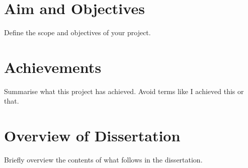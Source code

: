 \section{Aim and Objectives} \label{sec:objectives}
Define the scope and objectives of your project.

\section{Achievements}
Summarise what this project has achieved. Avoid terms like I achieved this or 
that. 

\section{Overview of Dissertation}
Briefly overview the contents of what follows in the dissertation.